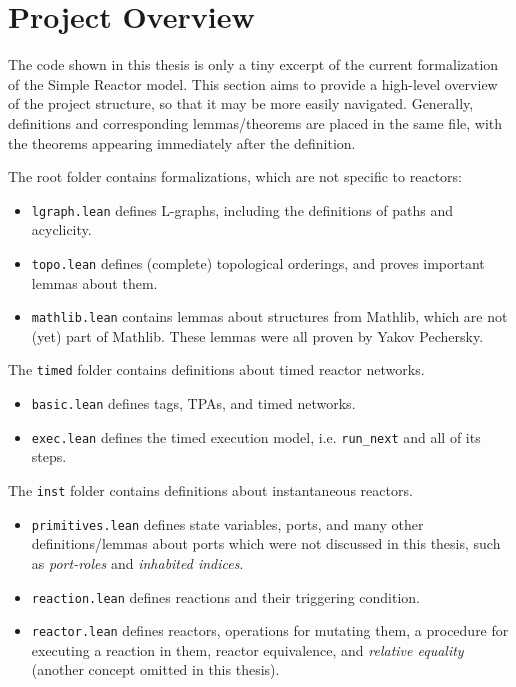 \section{Project Overview}

The code shown in this thesis is only a tiny excerpt of the current formalization of the Simple Reactor model.
This section aims to provide a high-level overview of the project structure, so that it may be more easily navigated.
Generally, definitions and corresponding lemmas/theorems are placed in the same file, with the theorems appearing immediately after the definition.

\vspace{3mm}

\noindent The root folder contains formalizations, which are not specific to reactors:
\begin{itemize}
    \item \verb|lgraph.lean| defines L-graphs, including the definitions of paths and acyclicity.
    \item \verb|topo.lean| defines (complete) topological orderings, and proves important lemmas about them.
    \item \verb|mathlib.lean| contains lemmas about structures from Mathlib, which are not (yet) part of Mathlib.
    These lemmas were all proven by Yakov Pechersky.
\end{itemize}

\noindent The \verb|timed| folder contains definitions about timed reactor networks.
\begin{itemize}
    \item \verb|basic.lean| defines tags, TPAs, and timed networks.
    \item \verb|exec.lean| defines the timed execution model, i.e. \lstinline{run_next} and all of its steps.
\end{itemize}

\noindent The \verb|inst| folder contains definitions about instantaneous reactors.
\begin{itemize}
    \item \verb|primitives.lean| defines state variables, ports, and many other definitions/lemmas about ports which were not discussed in this thesis, such as \emph{port-roles} and \emph{inhabited indices}.
    \item \verb|reaction.lean| defines reactions and their triggering condition.
    \item \verb|reactor.lean| defines reactors, operations for mutating them, a procedure for executing a reaction in them, reactor equivalence, and \emph{relative equality} (another concept omitted in this thesis).
\end{itemize}

